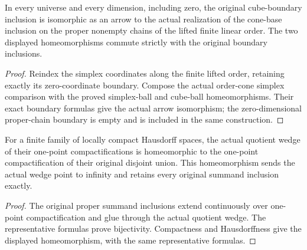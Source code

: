 \begin{proposition}
  \label{prop:actual-order-cube-pair-comparison}
  \leanok
  In every universe and every dimension, including zero, the original cube-boundary inclusion is isomorphic as an arrow to the actual realization of the cone-base inclusion on the proper nonempty chains of the lifted finite linear order. The two displayed homeomorphisms commute strictly with the original boundary inclusions.
\end{proposition}
\begin{proof}
  Reindex the simplex coordinates along the finite lifted order, retaining exactly its zero-coordinate boundary. Compose the actual order-cone simplex comparison with the proved simplex-ball and cube-ball homeomorphisms. Their exact boundary formulas give the actual arrow isomorphism; the zero-dimensional proper-chain boundary is empty and is included in the same construction.
  \leanok
\end{proof}

\begin{proposition}
  \label{prop:actual-finite-wedge-one-point-compactification}
  \leanok
  For a finite family of locally compact Hausdorff spaces, the actual quotient wedge of their one-point compactifications is homeomorphic to the one-point compactification of their original disjoint union. This homeomorphism sends the actual wedge point to infinity and retains every original summand inclusion exactly.
\end{proposition}
\begin{proof}
  The original proper summand inclusions extend continuously over one-point compactification and glue through the actual quotient wedge. The representative formulas prove bijectivity. Compactness and Hausdorffness give the displayed homeomorphism, with the same representative formulas.
  \leanok
\end{proof}

